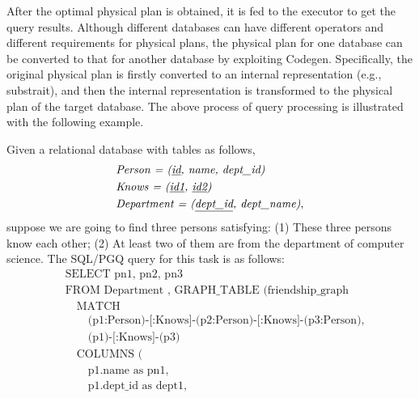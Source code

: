 After the optimal physical plan is obtained, it is fed to the executor to get the query results.
Although different databases can have different operators and different requirements for physical plans, the physical plan for one database can be converted to that for another database by exploiting Codegen.
Specifically, the original physical plan is firstly converted to an internal representation (e.g., substrait), and then the internal representation is transformed to the physical plan of the target database.
The above process of query processing is illustrated with the following example.

\begin{example}
    Given a relational database with tables as follows,
    \begin{equation*}
        \begin{split}
            & \textit{Person = (\underline{id}, name, dept\_id)} \\
            & \textit{Knows = (\underline{id1}, \underline{id2})} \\
            & \textit{Department = (\underline{dept\_id}, dept\_name)}, \\
        \end{split}
    \end{equation*}
    suppose we are going to find three persons satisfying: 
    (1) These three persons know each other;
    (2) At least two of them are from the department of computer science.
    The SQL/PGQ query for this task is as follows:
    \begin{equation*}
        \begin{split}
            & \text{SELECT pn1, pn2, pn3} \\
            & \text{FROM Department , GRAPH\_TABLE (friendship\_graph} \\
            &  \hspace{1em} \text{MATCH} \\
            &   \hspace{2em} \text{(p1:Person)-[:Knows]-(p2:Person)-[:Knows]-(p3:Person),} \\
            &   \hspace{2em} \text{(p1)-[:Knows]-(p3)} \\
            &  \hspace{1em} \text{COLUMNS (} \\
            &   \hspace{2em} \text{p1.name as pn1,} \\
            &   \hspace{2em} \text{p1.dept\_id as dept1,} \\

\end{split}
\end{equation*}
\end{example}
